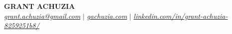 \begin{center}
    \textbf{\Huge GRANT ACHUZIA} \\ \vspace{1pt}
    \href{mailto:grant.achuzia@gmail.com}{\emph{grant.achuzia@gmail.com}} \hspace{0.05em} $|$ \hspace{0.05em}
    \href{https://gachuzia.com/}{\emph{gachuzia.com}} \hspace{0.05em} $|$ \hspace{0.05em}
    \href{https://www.linkedin.com/in/grant-achuzia-8259251b8/}{\emph{linkedin.com/in/grant-achuzia-8259251b8/}}
    
\end{center} 